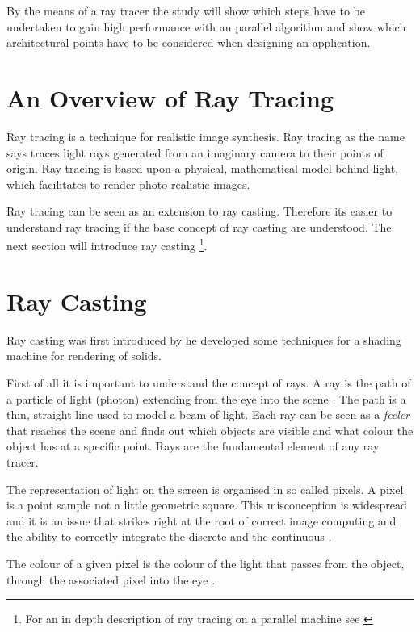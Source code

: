 By the means of a ray tracer the study will show which steps have to be 
undertaken to gain high performance with an parallel algorithm and show which 
architectural points have to be considered when designing an application.

\section{An Overview of Ray Tracing}
Ray tracing is a technique for realistic image synthesis. Ray tracing as the
name says traces light rays generated from an imaginary camera to their points
of origin. Ray tracing is based upon a physical, mathematical model behind
light, which facilitates to render photo realistic images. 

Ray tracing can be seen as an extension to ray casting. Therefore its easier to
understand ray tracing if the base concept of ray casting are understood. The
next section will introduce ray casting \footnote{For an in depth description of
ray tracing on a parallel machine see \citeauthor{citeulike:80546}
\citep{citeulike:80546}}.

\section{Ray Casting}
Ray casting was first introduced by \citeauthor{citeulike:841961}
\citep{citeulike:841961} he developed some techniques for a shading machine for
rendering of solids.

First of all it is important to understand the concept of rays. A ray is the
path of a particle of light (photon) extending from the eye into the
scene \citep{Glassner289}. The path is a thin, straight line used to model a beam
of light. Each ray can be seen as a \textit{feeler} that reaches the 
scene and finds out which objects are visible and what colour the object has at a 
specific point. Rays are the fundamental element of any ray tracer.

The representation of light on the screen is organised in so called pixels.
A pixel is a point sample not a little geometric square. This misconception
is widespread and it is an issue that strikes right at the root of correct
image computing and the ability to correctly integrate the discrete and the
continuous \citep{AlvyRaySmith95}.

The colour of a given pixel is the colour of the light that passes from the
object, through the associated pixel into the eye \citep{Hearn94}.

